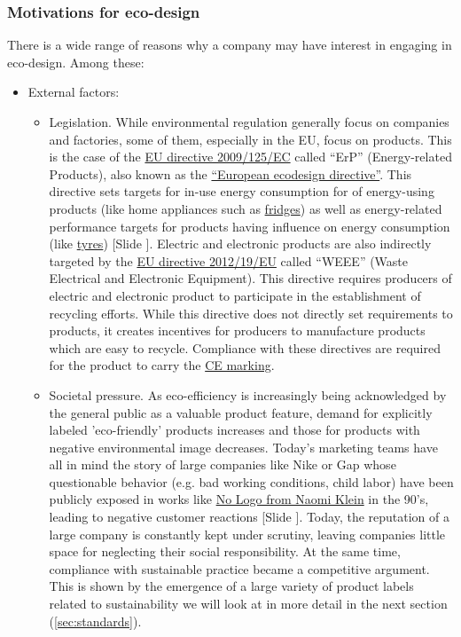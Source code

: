 \documentclass{article}
\newcounter{slide}
\begin{document}
\subsubsection{Motivations for eco-design}
\label{sec:motivations}
There is a wide range of reasons why a company may have interest in engaging in eco-design. Among these:
\begin{itemize}
	\item External factors:
	\begin{itemize}
		\item Legislation. While environmental regulation generally focus on companies and factories, some of them, especially in the EU, focus on products. This is the case of the \href{https://eur-lex.europa.eu/legal-content/EN/ALL/?uri=CELEX:32009L0125}{EU directive 2009/125/EC} called ``ErP'' (Energy-related Products), also known as the \href{https://en.wikipedia.org/wiki/European_Ecodesign_Directive}{``European ecodesign directive''}. This directive sets targets for in-use energy consumption for of energy-using products (like home appliances such as \href{https://ec.europa.eu/energy/en/topics/energy-efficiency/energy-efficient-products/fridges-and-freezers}{fridges}) as well as energy-related performance targets for products having influence on energy consumption (like \href{https://ec.europa.eu/energy/en/topics/energy-efficiency/energy-efficient-products/tyres}{tyres}) {\color{blue}[Slide ]}. Electric and electronic products are also indirectly targeted by the \href{https://eur-lex.europa.eu/legal-content/EN/TXT/?uri=CELEX:32012L0019}{EU directive 2012/19/EU} called ``WEEE'' (Waste Electrical and Electronic Equipment). This directive requires producers of electric and electronic product to participate in the establishment of recycling efforts. While this directive does not directly set requirements to products, it creates incentives for producers to manufacture products which are easy to recycle. Compliance with these directives are required for the product to carry the \href{https://en.wikipedia.org/wiki/CE_marking}{CE marking}.
		\item Societal pressure. As eco-efficiency is increasingly being acknowledged by the general public as a valuable product feature, demand for explicitly labeled 'eco-friendly' products increases and those for products with negative environmental image decreases. Today's marketing teams have all in mind the story of large companies like Nike or Gap whose questionable behavior (e.g. bad working conditions, child labor) have been publicly exposed in works like \href{https://en.wikipedia.org/wiki/No_Logo}{No Logo from Naomi Klein} in the 90's, leading to negative customer reactions {\color{blue}[Slide ]}. Today, the reputation of a large company is constantly kept under scrutiny, leaving companies little space for neglecting their social responsibility. At the same time, compliance with sustainable practice became a competitive argument. This is shown by the emergence of a large variety of product labels related to sustainability we will look at in more detail in the next section (\ref{sec:standards}).

\end{itemize}
\end{itemize}
\end{document}
